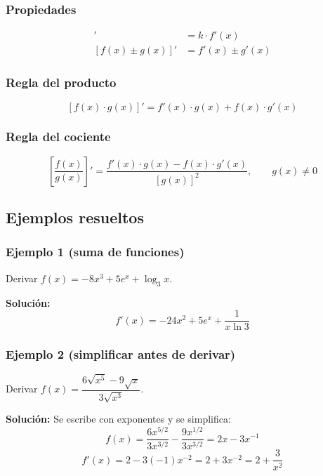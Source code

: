 \documentclass[12pt]{article}
\begin{document}
\subsubsection{Propiedades}


\begin{align*}
[k \cdot f(x)]' &= k \cdot f'(x) \\
[f(x) \pm g(x)]' &= f'(x) \pm g'(x)
\end{align*}



\subsubsection{Regla del producto}


\[
[f(x) \cdot g(x)]' = f'(x) \cdot g(x) + f(x) \cdot g'(x)
\]



\subsubsection{Regla del cociente}


\[
\left[\frac{f(x)}{g(x)}\right]' = \frac{f'(x) \cdot g(x) - f(x) \cdot g'(x)}{[g(x)]^2}, \qquad g(x) \neq 0
\]



\subsection{Ejemplos resueltos}

\subsubsection{Ejemplo 1 (suma de funciones)}


Derivar $f(x) = -8x^3 + 5e^x + \log_3 x$.

\textbf{Solución:}
\[
f'(x) = -24x^2 + 5e^x + \frac{1}{x \ln 3}
\]



\subsubsection{Ejemplo 2 (simplificar antes de derivar)}


Derivar $f(x) = \dfrac{6\sqrt{x^5} - 9\sqrt{x}}{3\sqrt{x^3}}$.

\textbf{Solución:} Se escribe con exponentes y se simplifica:
\[
f(x) = \frac{6x^{5/2}}{3x^{3/2}} - \frac{9x^{1/2}}{3x^{3/2}} = 2x - 3x^{-1}
\]
\[
f'(x) = 2 - 3(-1)x^{-2} = 2 + 3x^{-2} = 2 + \frac{3}{x^2}
\]
\end{document}
